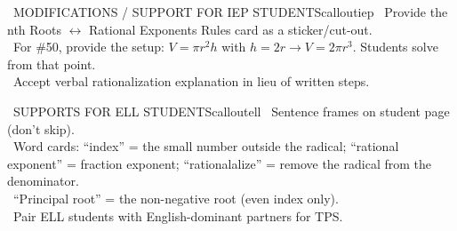 \documentclass[11pt]{article}
\begin{document}
\begin{callout}{\IconPuzzle\ MODIFICATIONS / SUPPORT FOR IEP STUDENTS}{calloutiep}
\textbullet\ Provide the nth Roots \(\leftrightarrow\) Rational Exponents Rules card as a sticker/cut-out.\\
\textbullet\ For \#50, provide the setup: \(V = \pi r^2 h\) with \(h = 2r \rightarrow V = 2\pi r^3\). Students solve from that point.\\
\textbullet\ Accept verbal rationalization explanation in lieu of written steps.
\end{callout}

\begin{callout}{\IconGlobe\ SUPPORTS FOR ELL STUDENTS}{calloutell}
\textbullet\ Sentence frames on student page (don't skip).\\
\textbullet\ Word cards: ``index'' = the small number outside the radical; ``rational exponent'' = fraction exponent; ``rationalalize'' = remove the radical from the denominator.\\
\textbullet\ ``Principal root'' = the non-negative root (even index only).\\
\textbullet\ Pair ELL students with English-dominant partners for TPS.
\end{callout}
\end{document}
